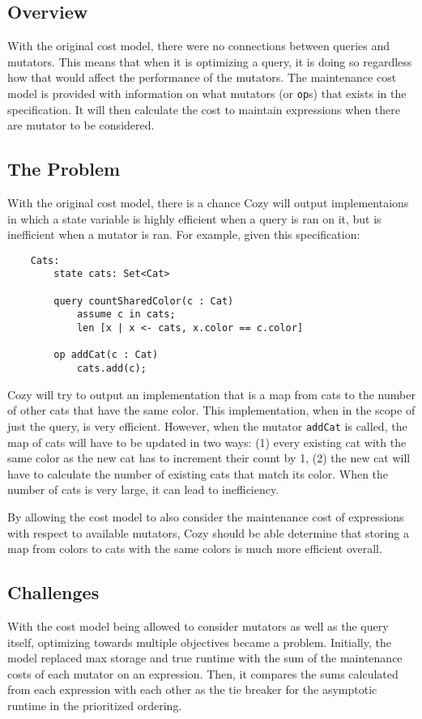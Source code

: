 \newcommand{\code}[1]{\texttt{#1}}

\subsection{Overview}
With the original cost model, there were no connections between queries and
mutators. This means that when it is optimizing a query, it is doing so
regardless how that would affect the performance of the mutators.
The maintenance cost model is provided with information on what mutators (or
\code{op}s) that exists in the specification. It will then calculate the cost to
maintain expressions when there are mutator to be considered.

\subsection{The Problem}
With the original cost model, there is a chance Cozy will output implementaions
in which a state variable is highly efficient when a query is ran on it, but
is inefficient when a mutator is ran. For example, given this specification:

\begin{lstlisting}
    Cats:
        state cats: Set<Cat>

        query countSharedColor(c : Cat)
            assume c in cats;
            len [x | x <- cats, x.color == c.color]

        op addCat(c : Cat)
            cats.add(c);
\end{lstlisting}

Cozy will try to output an implementation that is a map from cats to the number
of other cats that have the same color. This implementation, when in the scope
of just the query, is very efficient. However, when the mutator \code{addCat} is
called, the map of cats will have to be updated in two ways: (1) every existing
cat with the same color as the new cat has to increment their count by 1, (2)
the new cat will have to calculate the number of existing cats that match its
color. When the number of cats is very large, it can lead to inefficiency.

By allowing the cost model to also consider the maintenance cost of expressions
with respect to available mutators, Cozy should be able determine that storing
a map from colors to cats with the same colors is much more efficient overall.

\subsection{Challenges}
With the cost model being allowed to consider mutators as well as the query
itself, optimizing towards multiple objectives became a problem. Initially, the
model replaced max storage and true runtime with the sum of the maintenance
costs of each mutator on an expression. Then, it compares the sums calculated
from each expression with each other as the tie breaker for the asymptotic
runtime in the prioritized ordering.

